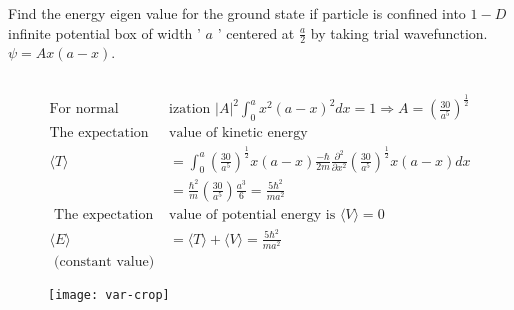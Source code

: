 \begin{exercise}
 Find the energy eigen value for the ground state if particle is confined into $1-D$ infinite potential box of width ' $a$ ' centered at $\frac{a}{2}$ by taking trial wavefunction. $\psi=A x(a-x)$.
\end{exercise}
\begin{answer}$\left. \right. $\\
	\begin{minipage}{0.5\textwidth}
		\begin{align*}	
		\text{For normal}&\text{ization }|A|^{2} \int_{0}^{a} x^{2}(a-x)^{2} d x=1 \Rightarrow A=\left(\frac{30}{a^{5}}\right)^{\frac{1}{2}}\\
		\text{The expectation }&\text{value of kinetic energy}\\
		\langle T\rangle&=\int_{0}^{a}\left(\frac{30}{a^{5}}\right)^{\frac{1}{2}} x(a-x) \frac{-\hbar}{2 m} \frac{\partial^{2}}{\partial x^{2}}\left(\frac{30}{a^{5}}\right)^{\frac{1}{2}} x(a-x) d x \\
		&=\frac{\hbar^{2}}{m}\left(\frac{30}{a^{5}}\right) \frac{a^{3}}{6}=\frac{5 \hbar^{2}}{m a^{2}}\\
	\text{	The expectation }&\text {value of potential energy is $\langle V\rangle=0$}\\
		\langle E\rangle&=\langle T\rangle+\langle V\rangle=\frac{5 \hbar^{2}}{m a^{2}}\\
	\text{	(constant value)}
		\end{align*}
	\end{minipage}
 \begin{minipage}{0.4\textwidth}
 \begin{figure}[H]
 	\centering
 	\texttt{[image: var-crop]}
 \end{figure}	
 \end{minipage}
\end{answer}
